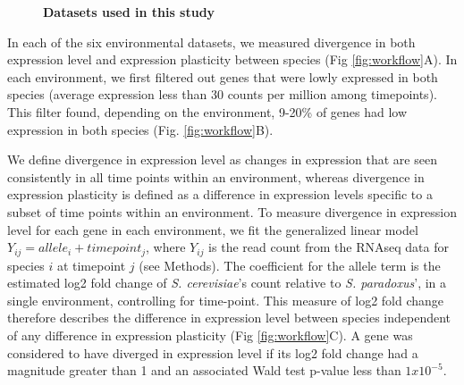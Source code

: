 \begin{figure}
    \centering
    \caption{\textbf{Datasets used in this study}}
    \label{fig:overview}
\end{figure}

In each of the six environmental datasets, we measured divergence in both expression level and expression plasticity between species (Fig \ref{fig:workflow}A). In each environment, we first filtered out genes that were lowly expressed in both species (average expression less than 30 counts per million among timepoints). This filter found, depending on the environment, 9-20\% of genes had low expression in both species (Fig. \ref{fig:workflow}B).

We define divergence in expression level as changes in expression that are seen consistently in all time points within an environment, whereas divergence in expression plasticity is defined as a difference in expression levels specific to a subset of time points within an environment. To measure divergence in expression level for each gene in each environment, we fit the generalized linear model $Y_{ij} = allele_i + timepoint_j$, where $Y_{ij}$ is the read count from the RNAseq data for species $i$ at timepoint $j$ (see Methods). The coefficient for the allele term is the estimated log2 fold change of \textit{S. cerevisiae}’s count relative to \textit{S. paradoxus}’, in a single environment, controlling for time-point. This measure of log2 fold change therefore describes the difference in expression level between species independent of any difference in expression plasticity (Fig \ref{fig:workflow}C). A gene was considered to have diverged in expression level if its log2 fold change had a magnitude greater than 1 and an associated Wald test p-value less than $1x10^{-5}$.

